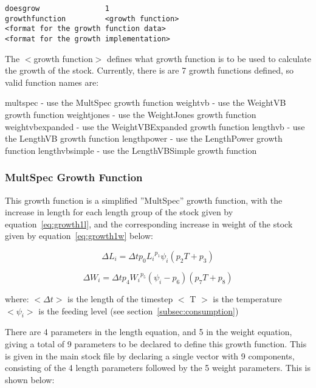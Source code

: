 \documentclass [a4paper, 10pt]{book}
\begin{document}
{\small\begin{verbatim}
doesgrow               1
growthfunction         <growth function>
<format for the growth function data>
<format for the growth implementation>
\end{verbatim}}

The $<$growth function$>$ defines what growth function is to be used to calculate the growth of the stock.  Currently, there is are 7 growth functions defined, so valid function names are:

\bigskip
multspec - use the MultSpec growth function\newline
weightvb - use the WeightVB growth function\newline
weightjones - use the WeightJones growth function\newline
weightvbexpanded - use the WeightVBExpanded growth function\newline
lengthvb - use the LengthVB growth function\newline
lengthpower - use the LengthPower growth function\newline
lengthvbsimple - use the LengthVBSimple growth function

\subsubsection{MultSpec Growth Function}\label{subsec:growth1}
This growth function is a simplified ''MultSpec'' growth function, with the increase in length for each length group of the stock given by equation~\ref{eq:growth1l}, and the corresponding increase in weight of the stock given by equation~\ref{eq:growth1w} below:

\begin{equation}\label{eq:growth1l}
\Delta L_{i} = \Delta t p_{0} {L_{i}}^{p_{1}} \psi_{i} (p_{2} T + p_{3})
\end{equation}

\begin{equation}\label{eq:growth1w}
\Delta W_{i} = \Delta t p_{4} {W_{i}}^{p_{5}} (\psi_{i} - p_{6}) (p_{7} T + p_{8})
\end{equation}

where:\newline
$<\Delta t>$ is the length of the timestep\newline
$<$ T $>$ is the temperature\newline
$<\psi_{i}>$ is the feeding level (see section~\ref{subsec:consumption})

\bigskip
There are 4 parameters in the length equation, and 5 in the weight equation, giving a total of 9 parameters to be declared to define this growth function.  This is given in the main stock file by declaring a single vector with 9 components, consisting of the 4 length parameters followed by the 5 weight parameters.  This is shown below:
\end{document}

